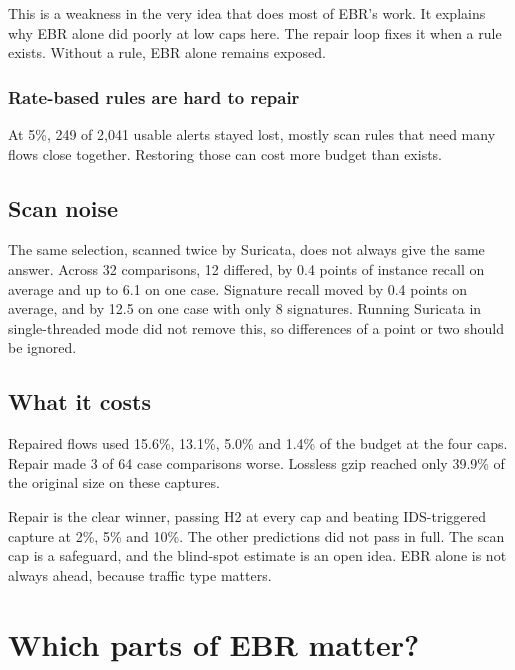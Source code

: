\begin{bigidea}
This is a weakness in the very idea that does most of EBR's work. It explains why EBR alone did poorly at low caps here. The repair loop fixes it when a rule exists. Without a rule, EBR alone remains exposed.
\end{bigidea}

\subsection{Rate-based rules are hard to repair}
At 5\%, 249 of 2,041 usable alerts stayed lost, mostly scan rules that need many flows close together. Restoring those can cost more budget than exists.

\section{Scan noise}
The same selection, scanned twice by Suricata, does not always give the same answer. Across 32 comparisons, 12 differed, by 0.4 points of instance recall on average and up to 6.1 on one case. Signature recall moved by 0.4 points on average, and by 12.5 on one case with only 8 signatures. Running Suricata in single-threaded mode did not remove this, so differences of a point or two should be ignored.

\section{What it costs}
Repaired flows used 15.6\%, 13.1\%, 5.0\% and 1.4\% of the budget at the four caps. Repair made 3 of 64 case comparisons worse. Lossless gzip reached only 39.9\% of the original size on these captures.

\begin{recap}
Repair is the clear winner, passing H2 at every cap and beating IDS-triggered capture at 2\%, 5\% and 10\%. The other predictions did not pass in full. The scan cap is a safeguard, and the blind-spot estimate is an open idea. EBR alone is not always ahead, because traffic type matters.
\end{recap}

\chapter{Which parts of EBR matter?}
\label{ch:parts}

